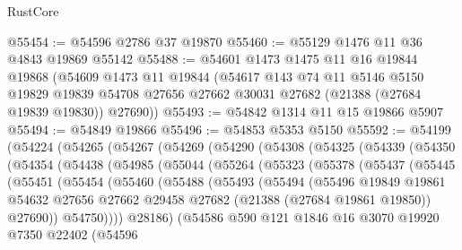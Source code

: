 \begin{lexlean}{RustCore}
\begin{coremodule}
@55454 := @54596 @2786 @37 @19870
@55460 := @55129 @1476 @11 @36 @4843 @19869 @55142
@55488 := @54601
    @1473
    @1475
    @11
    @16
    @19844
    @19868
    (@54609
      @1473
      @11
      @19844
      (@54617
        @143
        @74
        @11
        @5146
        @5150
        @19829
        @19839
        @54708
        @27656
        @27662
        @30031
        @27682
        (@21388 (@27684 @19839 @19830))
        @27690))
@55493 := @54842 @1314 @11 @15 @19866 @5907
@55494 := @54849 @19866
@55496 := @54853 @5353 @5150
@55592 := @54199
    (@54224
      (@54265
        (@54267
          (@54269
            (@54290
              (@54308
                (@54325
                  (@54339
                    (@54350
                      (@54354
                        (@54438
                          (@54985
                            (@55044
                              (@55264
                                (@55323
                                  (@55378
                                    (@55437
                                      (@55445
                                        (@55451
                                          (@55454
                                            (@55460
                                              (@55488
                                                (@55493
                                                  (@55494
                                                    (@55496
                                                      @19849
                                                      @19861
                                                      @54632
                                                      @27656
                                                      @27662
                                                      @29458
                                                      @27682
                                                      (@21388 (@27684 @19861 @19850))
                                                      @27690))
                                                  @54750))))
                                          @28186)
                                        (@54586
                                          @590
                                          @121
                                          @1846
                                          @16
                                          @3070
                                          @19920
                                          @7350
                                          @22402
                                          (@54596

\end{coremodule}
\end{lexlean}
